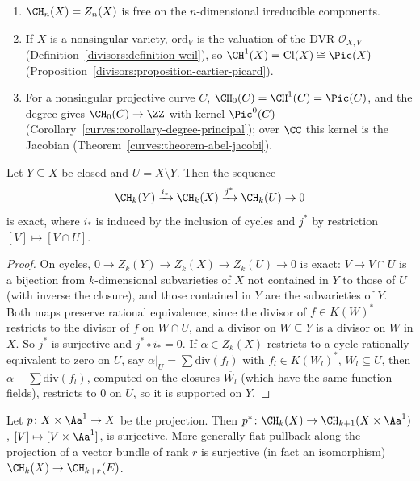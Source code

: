 \begin{example}\label{intersection-theory:example-chow-first}
\begin{enumerate}
\item $\CH_n(X) = Z_n(X)$ is free on the $n$-dimensional irreducible components.
\item If $X$ is a nonsingular variety, $\mathrm{ord}_V$ is the valuation of the DVR $\mathcal{O}_{X,V}$ (Definition~\ref{divisors:definition-weil}), so
$\CH^1(X) = \mathrm{Cl}(X) \cong \Pic(X)$ (Proposition~\ref{divisors:proposition-cartier-picard}).
\item For a nonsingular projective curve $C$, $\CH_0(C) = \CH^1(C) = \Pic(C)$, and the degree gives $\CH_0(C) \to \ZZ$ with kernel $\Pic^0(C)$
(Corollary~\ref{curves:corollary-degree-principal}); over $\CC$ this kernel is the Jacobian (Theorem~\ref{curves:theorem-abel-jacobi}).
\end{enumerate}
\end{example}

\begin{proposition}\label{intersection-theory:proposition-localisation}
Let $Y \subseteq X$ be closed and $U = X \setminus Y$. Then the sequence
\[
\CH_k(Y) \xrightarrow{i_*} \CH_k(X) \xrightarrow{j^*} \CH_k(U) \to 0
\]
is exact, where $i_*$ is induced by the inclusion of cycles and $j^*$ by restriction $[V] \mapsto [V \cap U]$.
\end{proposition}

\begin{proof}
On cycles, $0 \to Z_k(Y) \to Z_k(X) \to Z_k(U) \to 0$ is exact: $V \mapsto V \cap U$ is a bijection from $k$-dimensional subvarieties of $X$ not contained in $Y$ to those of $U$ (with
inverse the closure), and those contained in $Y$ are the subvarieties of $Y$. Both maps preserve rational equivalence, since the divisor of $f \in K(W)^*$ restricts to the divisor of
$f$ on $W \cap U$, and a divisor on $W \subseteq Y$ is a divisor on $W$ in $X$. So $j^*$ is surjective and $j^* \circ i_* = 0$. If $\alpha \in Z_k(X)$ restricts to a cycle rationally
equivalent to zero on $U$, say $\alpha|_U = \sum\mathrm{div}(f_l)$ with $f_l \in K(W_l)^*$, $W_l \subseteq U$, then $\alpha - \sum\mathrm{div}(f_l)$, computed on the closures
$\overline{W_l}$ (which have the same function fields), restricts to $0$ on $U$, so it is supported on $Y$.
\end{proof}

\begin{proposition}\label{intersection-theory:proposition-homotopy}
Let $p \colon X \times \Aa^1 \to X$ be the projection. Then $p^* \colon \CH_k(X) \to \CH_{k+1}(X \times \Aa^1)$, $[V] \mapsto [V \times \Aa^1]$, is surjective. More generally flat
pullback along the projection of a vector bundle of rank $r$ is surjective (in fact an isomorphism) $\CH_k(X) \to \CH_{k+r}(E)$.
\end{proposition}

